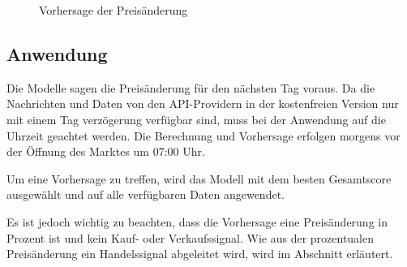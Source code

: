 \begin{figure}[H]
    \centering
    \caption{Vorhersage der Preisänderung}
    \label{fig:Predictions}
\end{figure}

\subsection{Anwendung}\label{sec:Anwendung}
Die Modelle sagen die Preisänderung für den nächsten Tag voraus. Da die Nachrichten und Daten von den API-Providern in der kostenfreien Version nur mit einem Tag verzögerung verfügbar sind, muss bei der Anwendung auf die Uhrzeit geachtet werden. Die Berechnung und Vorhersage erfolgen morgens vor der Öffnung des Marktes um 07:00 Uhr.
\par
Um eine Vorhersage zu treffen, wird das Modell mit dem besten Gesamtscore ausgewählt und auf alle verfügbaren Daten angewendet.
\par
Es ist jedoch wichtig zu beachten, dass die Vorhersage eine Preisänderung in Prozent ist und kein Kauf- oder Verkaufssignal. Wie aus der prozentualen Preisänderung ein Handelssignal abgeleitet wird, wird im Abschnitt  erläutert.

